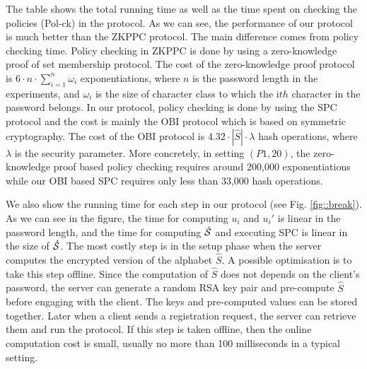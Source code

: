 The table shows the total running time as well as the time spent on checking the policies (Pol-ck) in the protocol. As we can see, the performance of our protocol is much better than the ZKPPC protocol. The main difference comes from policy checking time. Policy checking in ZKPPC is done by using a zero-knowledge proof of set membership protocol. 
The cost of the zero-knowledge proof protocol is $6\cdot n\cdot\sum_{i=1}^n\omega_i$ exponentiations, where $n$ is the password length in the experiments, and $\omega_i$ is the size of character class to which the i$th$ character in the password belongs. In our protocol,  policy checking is done by using the \ac{SPC} protocol and the cost is mainly the \ac{OBI} protocol which is based on symmetric cryptography. The cost of the \ac{OBI} protocol is $4.32\cdot |\hat{S}|\cdot \lambda$ hash operations, where $\lambda$ is the security parameter. More concretely, in setting $(P1,20)$,  the zero-knowledge proof based policy checking requires around 200,000 exponentiations while our \ac{OBI} based \ac{SPC} requires only less than 33,000 hash operations.


We also show the running time for each step in our protocol (see Fig. \ref{fig::break}). As we can see in the figure, the time for computing $u_i$ and $u_i'$ is linear in the password length, and the time for computing $\hat{\mathcal{S}}$ and executing \ac{SPC} is linear in the size of $\hat{\mathcal{S}}$. The most costly step is in the setup phase when the server computes the encrypted version of the alphabet $\hat{S}$. A possible optimisation is to take this step offline. 
Since the computation of $\hat{S}$ does not depends on the client's password, the server can generate a random RSA key pair and pre-compute $\hat{S}$ before engaging with the client. 
The keys and pre-computed values can be stored together. Later when a client sends a registration request, the server can retrieve them and run the protocol. If this step is taken offline, then the online computation cost is small, usually no more than 100 milliseconds in a typical setting. 
